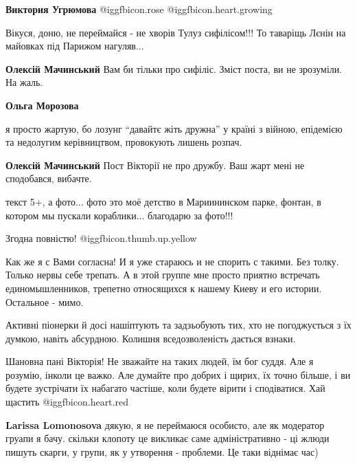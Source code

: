 \begin{itemize}
\begin{itemize}
\textbf{Виктория Угрюмова}  @igg{fbicon.rose}  @igg{fbicon.heart.growing} 
\end{itemize} %

Вікуся, доню, не переймайся - не хворів Тулуз сифілісом!!!
То таваріщь Лєнін на майовках під Парижом нагуляв...

\begin{itemize} %
\textbf{Олексій Мачинський} Вам би тільки про сифіліс. Зміст поста, ви не зрозуміли. На жаль.

\textbf{Ольга Морозова} 

я просто жартую, бо лозунг \enquote{давайтє жіть дружна} у країні з війною, епідемією
та недолугим керівництвом, провокують лишень розпач.

\textbf{Олексій Мачинський} Пост Вікторії не про дружбу. Ваш жарт мені не сподобався, вибачте.
\end{itemize} %


текст 5+, а фото... фото это моё детство в Мариининском парке, фонтан, в котором
мы пускали кораблики... благодарю за фото!!!


Згодна повністю!  @igg{fbicon.thumb.up.yellow} 


Как же я с Вами согласна! И я уже стараюсь и не спорить с такими. Без толку.
Только нервы себе трепать. А в этой группе мне просто приятно встречать
единомышленников, трепетно относящихся к нашему Киеву и его истории.
Остальное - мимо.


Активні піонерки й досі нашіптують та задзьобують тих, хто не погоджується з їх
думкою, навіть абсурдною. Колишня вседозволеність дається взнаки.


Шановна пані Вікторія! Не зважайте на таких людей, їм бог суддя. Але я розумію,
інколи це важко. Але думайте про добрих і щирих, їх точно більше, і ви будете
зустрічати їх набагато частіше, коли будете вірити і сподіватися. Хай щастить
@igg{fbicon.heart.red}

\begin{itemize} %
\textbf{Larissa Lomonosova} дякую, я не переймаюся особисто, але як модератор груапи я бачу. скільки клопоту це викликає саме адміністративно - ці жлюди пишуть скарги, у групи, як у утворення - проблеми. Це таки віднімає час)
\end{itemize} %


\end{itemize}
